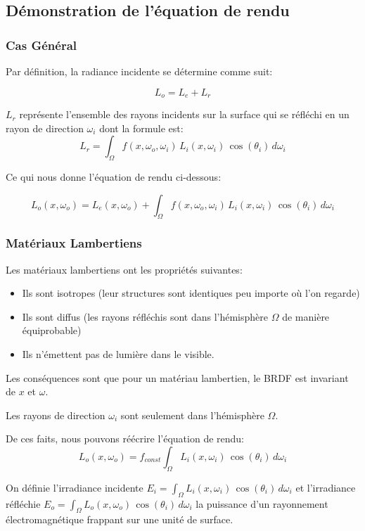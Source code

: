 \subsection{Démonstration de l'équation de rendu}
\label{subsec:demo_rendering}
\subsubsection{Cas Général}

Par définition, la radiance incidente se détermine comme suit:

$$L_{o} = L_{e} + L_{r}$$

$L_r$ représente l'ensemble des rayons incidents sur la surface qui se réfléchi en un rayon de direction $\omega_i$ dont la formule est:
$$L_r = \int_{\Omega}f(x, \omega_o, \omega_i) \, L_{i}(x, \omega_i) \, \cos(\theta_i) \, d\omega_i$$

Ce qui nous donne l'équation de rendu ci-dessous:

$$\boxed{L_{o}(x, \omega_o) = L_{e}(x, \omega_o) + \int_{\Omega}f(x, \omega_o, \omega_i) \, L_{i}(x, \omega_i) \, \cos(\theta_i) \, d\omega_i}$$


\subsubsection{Matériaux Lambertiens}

Les matériaux lambertiens ont les propriétés suivantes:
\begin{itemize}
\item Ils sont isotropes (leur structures sont identiques peu importe où l'on regarde)
\item Ils sont diffus (les rayons réfléchis sont dans l'hémisphère $\Omega$ de manière équiprobable)
\item Ils n'émettent pas de lumière dans le visible.
\end{itemize}

Les conséquences sont que pour un matériau lambertien, le BRDF est invariant de $x$ et $\omega$.

Les rayons de direction $\omega_i$ sont seulement dans l'hémisphère $\Omega$.

De ces faits, nous pouvons réécrire l'équation de rendu:
$$L_{o}(x, \omega_o) = f_{const}\int_{\Omega}L_{i}(x, \omega_i) \, \cos(\theta_i) \, d\omega_i$$

On définie l'irradiance incidente $E_i=\int_{\Omega}L_{i}(x, \omega_i) \, \cos(\theta_i) \, d\omega_i$ et l'irradiance réfléchie $E_o=\int_{\Omega}L_{o}(x, \omega_o) \, \cos(\theta_i) \, d\omega_i$ la puissance d'un rayonnement électromagnétique frappant sur une unité de surface.

